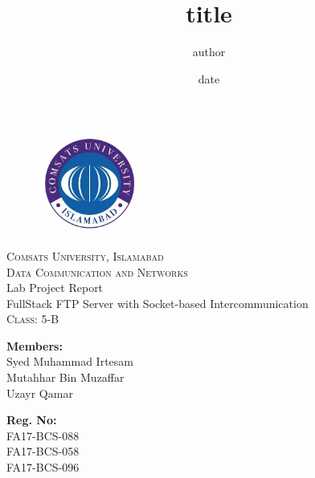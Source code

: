 \documentclass[12pt]{article}
\begin{document}
\title{title}
\author{author}
\date{date}

\begin{titlepage}
\begin{figure}[t]
    \centering\includegraphics[width=0.3\textwidth]{./images/COMSATS.jpg}
\end{figure}
\begin{center}
    \textsc{ \LARGE{Comsats University, Islamabad \\}}
	\textsc{ \LARGE{Data Communication and Networks\\ }}
	\textnormal{ \LARGE{Lab Project Report\\}}
	\vspace{20mm}
	\fontsize{10mm}{7mm}\selectfont 
	\textup{FullStack FTP Server with Socket-based Intercommunication}\\
	\textsc{ \LARGE{Class: 5-B\\ }}
\end{center}

\vspace{15mm}

\begin{minipage}[t]{0.47\textwidth}
	\textnormal{\large{\bf Members:\\}}
	{\large Syed Muhammad Irtesam\\ Mutahhar Bin Muzaffar\\ Uzayr Qamar}
\end{minipage}\hfill\begin{minipage}[t]{0.47\textwidth}\raggedleft
	\textnormal{\large{\bf Reg. No:\\}}
	{\large FA17-BCS-088\\ FA17-BCS-058\\ FA17-BCS-096}
\end{minipage}

\vspace{10mm}


\end{titlepage}

\tableofcontents
\end{document}
